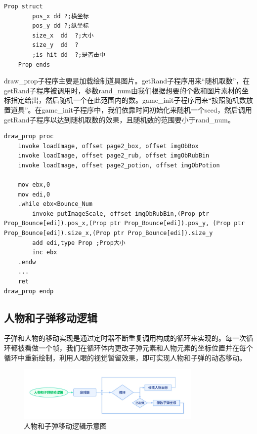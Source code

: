 \begin{lstlisting}[language={[x86masm]Assembler}]
    Prop struct
        pos_x dd ?;横坐标
        pos_y dd ?;纵坐标
        size_x	dd	?;大小
        size_y	dd	?
        ;is_hit dd	?;是否击中
    Prop ends
\end{lstlisting}
\par
draw\_prop子程序主要是加载绘制道具图片。getRand子程序用来“随机取数”，在getRand子程序被调用时，参数rand\_num由我们根据想要的个数和图片素材的坐标指定给出，然后随机一个在此范围内的数。game\_init子程序用来“按照随机数放置道具”。在game\_init子程序中，我们依靠时间初始化来随机一个seed，然后调用getRand子程序以达到随机取数的效果，且随机数的范围要小于rand\_num。
\begin{lstlisting}[language={[x86masm]Assembler}]
draw_prop proc
	invoke loadImage, offset page2_box, offset imgObBox
	invoke loadImage, offset page2_rub, offset imgObRubBin
	invoke loadImage, offset page2_potion, offset imgObPotion

	mov ebx,0
	mov edi,0
	.while ebx<Bounce_Num
		invoke putImageScale, offset imgObRubBin,(Prop ptr Prop_Bounce[edi]).pos_x,(Prop ptr Prop_Bounce[edi]).pos_y, (Prop ptr Prop_Bounce[edi]).size_x,(Prop ptr Prop_Bounce[edi]).size_y	
		add edi,type Prop ;Prop大小
		inc ebx
	.endw
    ...
	ret
draw_prop endp
\end{lstlisting}
\subsection{人物和子弹移动逻辑}
子弹和人物的移动实现是通过定时器不断重复调用构成的循环来实现的。每一次循环都被看做一个帧，我们在循环体内更改子弹元素和人物元素的坐标位置并在每个循环中重新绘制，利用人眼的视觉暂留效果，即可实现人物和子弹的动态移动。
\begin{figure}[htbp]
    \vspace{13pt} %
    \centering
    \includegraphics[width=0.8\textwidth]{images/3-5.jpg}
    \caption{人物和子弹移动逻辑示意图}%
\end{figure}
